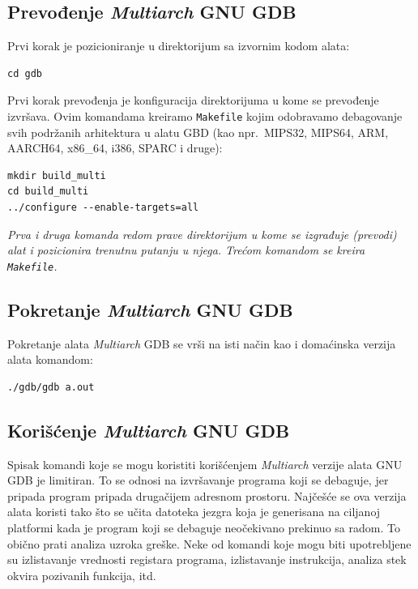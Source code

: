\documentclass[12pt,oneside]{memoir}
\begin{document}
\subsection{Prevođenje \emph{Multiarch} GNU GDB}

Prvi korak je pozicioniranje u direktorijum sa izvornim kodom alata:
\begin{lstlisting}
cd gdb

\end{lstlisting}

Prvi korak prevođenja je konfiguracija direktorijuma u kome se prevođenje izvršava. Ovim komandama kreiramo \texttt{Makefile} kojim odobravamo debagovanje svih podržanih arhitektura u alatu GBD (kao npr.~MIPS32, MIPS64, ARM, AARCH64, x86\_64, i386, SPARC i druge):

\begin{lstlisting}
mkdir build_multi
cd build_multi
../configure --enable-targets=all

\end{lstlisting}
\emph{Prva i druga komanda redom prave direktorijum u kome se izgrađuje (prevodi) alat i pozicionira trenutnu putanju u njega. Trećom komandom se kreira \texttt{Makefile}.}

\subsection{Pokretanje \emph{Multiarch} GNU GDB}

Pokretanje alata \emph{Multiarch} GDB se vrši na isti način kao i domaćinska verzija alata komandom:

\begin{lstlisting}
./gdb/gdb a.out

\end{lstlisting}

\subsection{Korišćenje \emph{Multiarch} GNU GDB}

Spisak komandi koje se mogu koristiti korišćenjem \emph{Multiarch} verzije alata GNU GDB je limitiran. To se odnosi na izvršavanje programa koji se debaguje, jer pripada program pripada drugačijem adresnom prostoru. Najčešće se ova verzija alata koristi tako što se učita datoteka jezgra koja je generisana na ciljanoj platformi kada je program koji se debaguje neočekivano prekinuo sa radom. To obično prati analiza uzroka greške. Neke od komandi koje mogu biti upotrebljene su izlistavanje vrednosti registara programa, izlistavanje instrukcija, analiza stek okvira pozivanih funkcija, itd.
\end{document}
